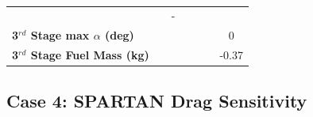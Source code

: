 \begin{table}[ht]
\begin{tabular}{l c c c c c c}
	& \thirdqOverFiveqSixtyNoReturn
	& -
	\\
	\textbf{3$^{rd}$ Stage max $\alpha$ (deg)}
	& \thirdmaxAoAqFortyNoReturn
	& \thirdmaxAoAqFortyFiveNoReturn
	& \thirdmaxAoAqStandardNoReturn
	& \thirdmaxAoAqFiftyFiveNoReturn
	& \thirdmaxAoAqSixtyNoReturn
	&0
	\\
	\textbf{3$^{rd}$ Stage Fuel Mass (kg)}
	& \thirdmFuelqFortyNoReturn
	& \thirdmFuelqFortyFiveNoReturn
	& \thirdmFuelqStandardNoReturn
	& \thirdmFuelqFiftyFiveNoReturn
	& \thirdmFuelqSixtyNoReturn
	&-0.37
	\\
	\hline 
\end{tabular} 
 \caption{}
 \label{tab:qvarnoreturn}
\end{table}





\subsection{Case 4: SPARTAN Drag Sensitivity}\label{sec:dragvariation}

